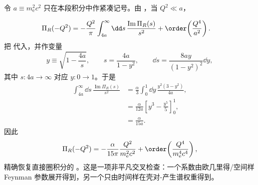 \begin{derivation}[低动量真空极化的谱积分]
令 $a\equiv m_{\mathrm e}^2c^2$ 只在本段积分中作紧凑记号。由 ，当 $Q^2\ll a$，

\begin{align*}
 \Pi_R(-Q^2)
 &=-\frac{Q^2}{\pi}
 \int_{4a}^{\infty}\dd s\,
 \frac{\operatorname{Im}\Pi_R(s)}{s^2}
 +\order\!\left(\frac{Q^4}{a^2}\right).
 \end{align*}
把  代入，并作变量
\begin{equation*}
 y\equiv\sqrt{1-\frac{4a}{s}},
 \qquad
 s=\frac{4a}{1-y^2},
 \qquad
 \dd s=\frac{8ay}{(1-y^2)^2}\dd y,
\end{equation*}
其中 $s:4a\to\infty$ 对应 $y:0\to1$。于是
\begin{align*}
 \int_{4a}^{\infty}\dd s\,
 \frac{\operatorname{Im}\Pi_R(s)}{s^2}
 &=\frac{\alpha}{3}
 \int_0^1\dd y\,
 \frac{y^2(3-y^2)}{4a},\\
 &=\frac{\alpha}{12a}
 \left[y^3-\frac{y^5}{5}\right]_0^1,\\
 &=\frac{\alpha}{15a}.
\end{align*}
因此
\begin{equation*}
 {
 \Pi_R(-Q^2)
 =-\frac{\alpha}{15\pi}
 \frac{Q^2}{m_{\mathrm e}^2c^2}
 +\order\!\left(\frac{Q^4}{m_{\mathrm e}^4c^4}\right),}
 \end{equation*}
精确恢复直接圈积分的 。这是一项非平凡交叉检查：一个系数由欧几里得/空间样 Feynman 参数展开得到，另一个只由时间样在壳对-产生谱权重得到。
\end{derivation}

